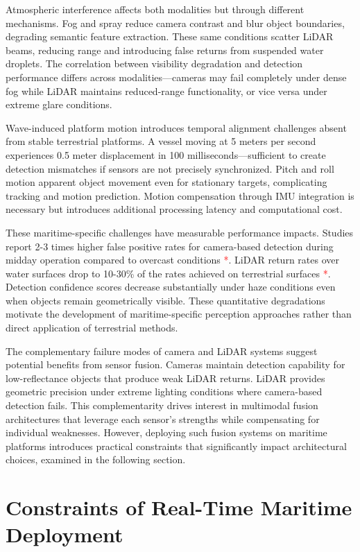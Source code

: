\documentclass[../main.tex]{subfiles}
\begin{document}
Atmospheric interference affects both modalities but through different mechanisms. Fog and spray reduce camera contrast and blur object boundaries, degrading semantic feature extraction. These same conditions scatter LiDAR beams, reducing range and introducing false returns from suspended water droplets. The correlation between visibility degradation and detection performance differs across modalities—cameras may fail completely under dense fog while LiDAR maintains reduced-range functionality, or vice versa under extreme glare conditions.

Wave-induced platform motion introduces temporal alignment challenges absent from stable terrestrial platforms. A vessel moving at 5 meters per second experiences 0.5 meter displacement in 100 milliseconds—sufficient to create detection mismatches if sensors are not precisely synchronized. Pitch and roll motion apparent object movement even for stationary targets, complicating tracking and motion prediction. Motion compensation through IMU integration is necessary but introduces additional processing latency and computational cost.

These maritime-specific challenges have measurable performance impacts. Studies report 2-3 times higher false positive rates for camera-based detection during midday operation compared to overcast conditions \textcolor{red}{*}. LiDAR return rates over water surfaces drop to 10-30\% of the rates achieved on terrestrial surfaces \textcolor{red}{*}. Detection confidence scores decrease substantially under haze conditions even when objects remain geometrically visible. These quantitative degradations motivate the development of maritime-specific perception approaches rather than direct application of terrestrial methods.

The complementary failure modes of camera and LiDAR systems suggest potential benefits from sensor fusion. Cameras maintain detection capability for low-reflectance objects that produce weak LiDAR returns. LiDAR provides geometric precision under extreme lighting conditions where camera-based detection fails. This complementarity drives interest in multimodal fusion architectures that leverage each sensor's strengths while compensating for individual weaknesses. However, deploying such fusion systems on maritime platforms introduces practical constraints that significantly impact architectural choices, examined in the following section.

\section{Constraints of Real-Time Maritime Deployment}
\end{document}

